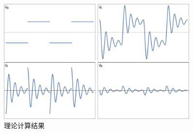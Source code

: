 \documentclass[a4paper,utf8]{article}
\begin{document}
        \begin{figure}[!ht]
            \includegraphics[width=0.9\textwidth]{1e.png}
            \caption{理论计算结果}
        \end{figure}\par
\end{document}
